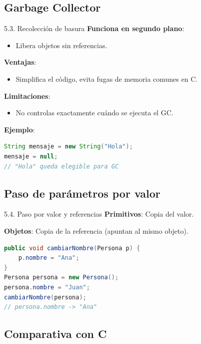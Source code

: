 \documentclass{beamer}
\begin{document}
\subsection{Garbage Collector}

\begin{frame}[fragile]{5.3. Recolección de basura}
\textbf{Funciona en segundo plano}:
\begin{itemize}
  \item Libera objetos sin referencias.
\end{itemize}

\textbf{Ventajas}:
\begin{itemize}
  \item Simplifica el código, evita fugas de memoria comunes en C.
\end{itemize}

\textbf{Limitaciones}:
\begin{itemize}
  \item No controlas exactamente cuándo se ejecuta el GC.
\end{itemize}

\textbf{Ejemplo}:
\begin{lstlisting}[language=Java]
String mensaje = new String("Hola");
mensaje = null; 
// "Hola" queda elegible para GC
\end{lstlisting}
\end{frame}

\subsection{Paso de parámetros por valor}

\begin{frame}[fragile]{5.4. Paso por valor y referencias}
\textbf{Primitivos}: Copia del valor. 

\textbf{Objetos}: Copia de la referencia (apuntan al mismo objeto).

\begin{lstlisting}[language=Java]
public void cambiarNombre(Persona p) {
    p.nombre = "Ana";
}
Persona persona = new Persona();
persona.nombre = "Juan";
cambiarNombre(persona);
// persona.nombre -> "Ana"
\end{lstlisting}
\end{frame}

\subsection{Comparativa con C}
\end{document}
